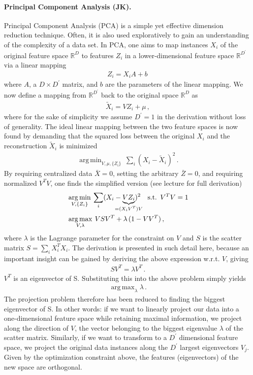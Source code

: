 \documentclass[12pt, a4paper]{scrartcl}
\DeclareMathOperator*{\argmin}{arg\,min}
\DeclareMathOperator*{\argmax}{arg\,max}
\begin{document}
\paragraph{Principal Component Analysis (JK).} Principal Component Analysis (PCA) is a simple yet effective dimension reduction technique. Often, it is also used exploratively to gain an understanding of the complexity of a data set. In PCA, one aims to map instances $X_i$ of the original feature space $\mathbb{R}^D$ to features $Z_i$ in a lower-dimensional feature space $\mathbb{R}^{D^\prime}$ via a linear mapping
\begin{align}
	Z_i = X_i A + b \, 
\end{align}
where $A$, a $D\times D^\prime$ matrix, and $b$ are the parameters of the linear mapping. We now define a mapping from $\mathbb{R}^{D^\prime}$  back to the original space $\mathbb{R}^D$ as
\begin{align}
	\tilde{X}_i = V Z_i + \mu \, ,
\end{align}
where for the sake of simplicity we assume $D^\prime=1$ in the derivation without loss of generality.
The ideal linear mapping between the two feature spaces is now found by demanding that the squared loss between the original $X_i$ and the reconstruction $\tilde{X}_i$ is minimized
\begin{align}
	\argmin_{V, \mu, \{Z_i\}} \: \sum_i \left( X_i - \tilde{X}_i \right)^2 \, .
\end{align}
By requiring centralized data $\bar{X}=0$, setting the arbitrary $\bar{Z}=0$, and requiring normalized $V^TV$, one finds the simplified version (see lecture for full derivation)
\begin{align}
	&\argmin_{V, \{Z_i\}} \: \sum_i ( X_i - 
														\underbrace{V Z_i}_{\mathclap{=(X_i V^T)V}}
														)^2 \quad
														\text{s.t.} \enspace V^TV=1  \\
	&\argmax_{V, \lambda} \: VSV^T + \lambda \,  (1-VV^T) \, ,													\end{align}
where $\lambda$ is the Lagrange parameter for the constraint on $V$ and $S$ is the scatter matrix $S = \sum_i X_i^T X_i$. 
The derivation is presented in such detail here, because an important insight can be gained  by deriving the above expression w.r.t. $V$, giving
\begin{align}
	S V^T = \lambda V^T \, .
\end{align}
$V^T$ is an eigenvector of S. Substituting this into the above problem simply yields
\begin{align}
	\argmax_\lambda \lambda \, .
\end{align}
The projection problem therefore has been reduced to finding the biggest eigenvector of S. In other words: if we want to linearly project our data into a one-dimensional feature space while retaining maximal information, we project along the direction of $V$, the vector belonging to the biggest eigenvalue $\lambda$ of the scatter matrix. Similarly, if we want to transform to a $D^\prime$ dimensional feature space, we project the original data instances along the $D^\prime$ largest eigenvectors $V_j$. Given by the optimization constraint above, the features (eigenvectors) of the new space are orthogonal. 
\end{document}
